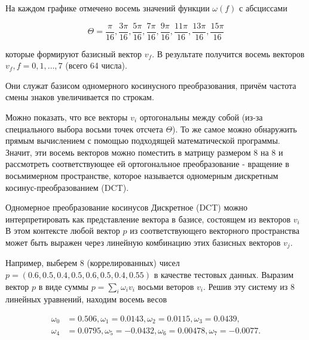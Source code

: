 На каждом графике отмечено восемь значений функции $\omega(f)$ с абс­циссами

\begin{equation}
    \Theta = \frac{\pi}{16}, 
                \frac{3\pi}{16}, 
                \frac{5\pi}{16}, 
                \frac{7\pi}{16}, 
                \frac{9\pi}{16}, 
                \frac{11\pi}{16}, 
                \frac{13\pi}{16}, 
                \frac{15\pi}{16}
    \label{eq:theta_values}
\end{equation}


которые формируют базисный вектор $v_f$. В результате получится восемь векторов $v_f, f = 0, 1, \dots, 7$ (всего 64 числа).

\clearpage
\BasisDCT

Они служат базисом одномерного косинусного преобразования, причём частота смены знаков увеличивается по строкам.

Можно показать, что все векторы $v_i$ ортогональны между со­бой (из-за специального выбора восьми точек отсчета $\Theta$). 
То же самое можно обнаружить прямым вычислением с помощью подхо­дящей математической программы. 
Значит, эти восемь векторов можно поместить в матрицу размером 8 на 8 и рассмотреть соот­ветствующее ей ортогональное преобразование - 
вращение в вось­мимерном пространстве, которое называется одномерным дискрет­ным косинус-преобразованием (DCT). 

Одномерное преобразование косинусов Дискретное (DCT) можно интерпретировать как представление вектора в базисе, состоящем из векторов $v_i$
В этом контексте любой вектор $p$ из соответствующего векторного пространства может быть выражен через линейную комбинацию этих базисных векторов $v_j$.


Например, выберем 8 (коррелированных) чисел $p=(0.6, 0.5, 0.4, 0.5, 0.6, 0.5, 0.4, 0.55)$ в качестве тестовых данных. 
Выразим вектор $p$ в виде суммы $p = \sum_{i}^{} \omega_i v_i$ восьми веторов $v_i$. 
Решив эту систему из 8 линейных уравнений, находим восемь весов

\begin{equation}
    \begin{aligned}
        \omega_0 &=0.506, \omega_1 = 0.0143, \omega_2 = 0.0115, \omega_3 = 0.0439, \\
        \omega_4 &=0.0795, \omega_5 = -0.0432, \omega_6 = 0.00478, \omega_7 = -0.0077.
    \end{aligned}
\end{equation}


